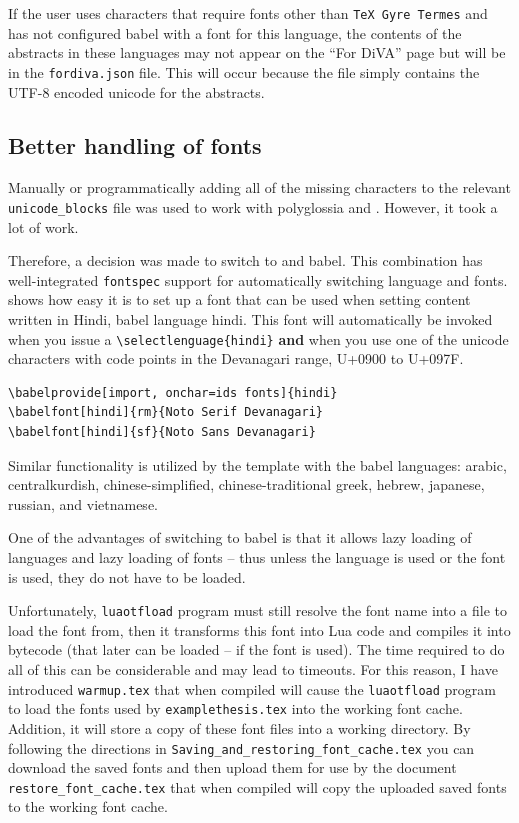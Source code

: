 \documentclass[12pt, twoside]{article}
\newcommand{\fname}[1]{\texttt{#1}}
\begin{document}
\FloatBarrier


If the user uses characters that require fonts other than \texttt{TeX Gyre Termes} and has not configured babel with a font for this language, the contents of the abstracts in these languages may not appear on the ``For DiVA'' page but will be in the \texttt{fordiva.json} file. This will occur because the file simply contains the UTF-8 encoded unicode for the abstracts.

\subsection{Better handling of fonts}
\label{sec:BetterHandlingOfFonts}

Manually or programmatically adding all of the missing characters to the relevant \texttt{unicode\_blocks} file was used to work with polyglossia and \XeLaTeX{}. However, it took a lot of work.

Therefore, a decision was made to switch to \LuaLaTeX{} and babel. This combination has well-integrated \texttt{fontspec} support for automatically switching language and fonts.  shows how easy it is to set up a font that can be used when setting content written in Hindi, \ie babel language hindi. This font will automatically be invoked when you issue a \texttt{\textbackslash selectlenguage\{hindi\}} \textbf{and} when you use one of the unicode characters with code points in the Devanagari range, \ie U+0900 to U+097F.

\begin{lstlisting}[language={[LaTeX]TeX}, caption={Establishing fonts to be used when setting content in Hindi}, label=lst:BabelHindiExample] 
\babelprovide[import, onchar=ids fonts]{hindi}
\babelfont[hindi]{rm}{Noto Serif Devanagari}
\babelfont[hindi]{sf}{Noto Sans Devanagari}
\end{lstlisting}

Similar functionality is utilized by the template with the babel languages: arabic, centralkurdish, chinese-simplified, chinese-traditional greek, hebrew, japanese, russian, and vietnamese.

One of the advantages of switching to babel is that it allows lazy loading of languages and lazy loading of fonts -- thus unless the language is used or the font is used, they do not have to be loaded.

Unfortunately, \texttt{luaotfload} program must still resolve the font name into a file to load the font from, then it transforms this font into Lua code and compiles it into bytecode (that later can be loaded -- if the font is used). The time required to do all of this can be considerable and may lead to timeouts. For this reason, I have introduced \fname{warmup.tex} that when compiled will cause the \texttt{luaotfload} program to load the fonts used by \fname{examplethesis.tex} into the working font cache. Addition, it will store a copy of these font files into a working directory. By following the directions in \fname{Saving\_and\_restoring\_font\_cache.tex} you can download the saved fonts and then upload them for use by the document \fname{restore\_font\_cache.tex} that when compiled will copy the uploaded saved fonts to the working font cache.
\end{document}
